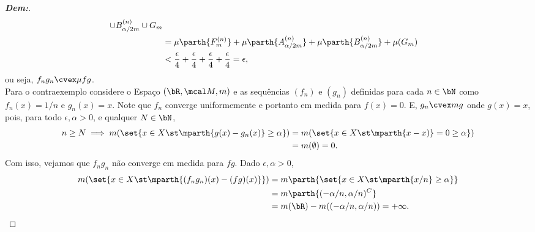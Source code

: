 \begin{proof}[\textbf{Dem:}]
\begin{align*}
{  \cup B_{\alpha/2m}^{(n)} \cup G_m }\\
  &=\mu\parth{F_m^{(n)}} +\mu\parth{A_{\alpha/2m}^{(n)}}
  +\mu\parth{B_{\alpha/2m}^{(n)}} +\mu(G_m)\\
  &< \frac{\epsilon}{4} + \frac{\epsilon}{4} + \frac{\epsilon}{4} + \frac{\epsilon}{4}
  = \epsilon,
\end{align*}
ou seja, $f_ng_n \cvex \mu fg$.\\
Para o contraexemplo considere o Espaço $(\bR, \mcal M, m)$ e 
as sequências $(f_n)$ e $(g_n)$ definidas 
para cada $n \in \bN$ como 
$f_n(x) = 1/n$ e $g_n(x) = x$. Note que $f_n$ converge uniformemente e portanto 
em medida para $f(x) = 0$. E, $g_n \cvex m g$ onde $g(x) = x$, pois, para todo 
$\epsilon, \alpha> 0$, e qualquer $N \in \bN$, 
\begin{align*}
  n \ge N \implies m(\set{x \in X \st \mparth{g(x) - g_n(x)}\ge \alpha}) &=
m(\set{x \in X \st \mparth{x - x)} = 0 \ge \alpha}) \\ 
  &= m(\emptyset) = 0.
\end{align*}
Com isso, vejamos que $f_ng_n$ não converge em medida para $fg$. Dado $\epsilon, \alpha>0$,
\begin{align*}
  m(\set{x \in X \st \mparth{(f_ng_n)(x) - (fg)(x)}}) &= 
    m\parth{\set{x \in X \st \mparth{x/n} \ge \alpha}}\\ 
    &= m\parth{(-\alpha/n, \alpha/n)^C}\\
    &= m(\bR) - m((-\alpha/n, \alpha/n)) = +\infty.
\end{align*}
\end{proof}

